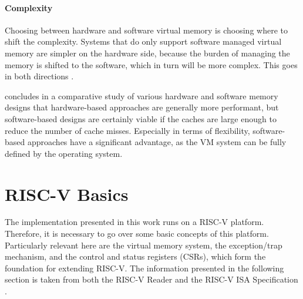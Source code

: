\paragraph{Complexity} Choosing between hardware and software virtual memory is choosing where to shift the complexity.
Systems that do only support software managed virtual memory are simpler on the hardware side, because the burden of managing the memory is shifted to the software, which in turn will be more complex.
This goes in both directions \cite{jacob1998virtualissues}.

\cite{jacob1998look} concludes in a comparative study of various hardware and software memory designs
that hardware-based approaches are generally more performant, but software-based designs are certainly
viable if the caches are large enough to reduce the number of cache misses.
Especially in terms of flexibility, software-based approaches have a significant advantage,
as the VM system can be fully defined by the operating system.








\section{RISC-V Basics}
The implementation presented in this work runs on a RISC-V platform. Therefore, it is necessary
to go over some basic concepts of this platform. Particularly relevant here are the virtual
memory system, the exception/trap mechanism, and the control and status registers (CSRs), which
form the foundation for extending RISC-V.
The information presented in the following section is taken from both the RISC-V Reader \cite{riscvreader} and the RISC-V ISA Specification \cite{RISCVInstructionSet}.

